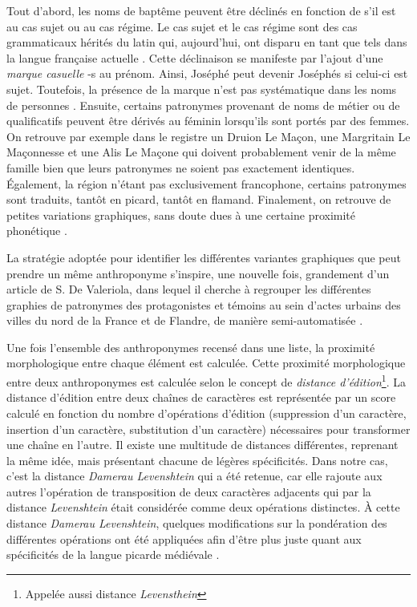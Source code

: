 Tout d'abord, les noms de baptême peuvent être déclinés en fonction de s'il est au cas sujet ou au cas régime\parencite{de_valeriola_lordinateur_2021}. Le cas sujet et le cas régime sont des cas grammaticaux hérités du latin qui, aujourd'hui, ont disparu en tant que tels dans la langue française actuelle \parencite{kalm_roland_2009}.
Cette déclinaison se manifeste par l'ajout d'une \textit{marque casuelle} \og -s \fg{} au prénom. Ainsi, \og Joséphé \fg{} peut devenir \og Joséphés \fg{} si celui-ci est sujet. Toutefois, la présence de la marque n'est pas systématique dans les noms de personnes \parencite{mazziotta_marquage_2014}.
Ensuite, certains patronymes provenant de noms de métier ou de qualificatifs peuvent être dérivés au féminin lorsqu'ils sont portés par des femmes. On retrouve par exemple dans le registre un Druion Le Maçon, une Margritain Le Maçonnesse et  une Alis Le Maçone qui doivent probablement venir de la même famille bien que leurs patronymes ne soient pas exactement identiques. Également, la région n'étant pas exclusivement francophone, certains patronymes sont traduits, tantôt en picard, tantôt en flamand. Finalement, on retrouve de petites variations graphiques, sans doute dues à une certaine proximité phonétique \parencite{de_valeriola_lordinateur_2021}.

La stratégie adoptée pour identifier les différentes variantes graphiques que peut prendre un même anthroponyme s'inspire, une nouvelle fois, grandement d'un article de S. De Valeriola, dans lequel il cherche à regrouper les différentes graphies de patronymes des protagonistes et témoins au sein d'actes urbains des villes du nord de la France et de Flandre, de manière semi-automatisée \parencite{de_valeriola_lordinateur_2021}.

Une fois l'ensemble des anthroponymes recensé dans une liste, la proximité morphologique entre chaque élément est calculée. Cette proximité morphologique entre deux anthroponymes est calculée selon le concept de \textit{distance d'édition}\footnote{Appelée aussi distance \textit{Levensthein}}. 
La distance d'édition entre deux chaînes de caractères est représentée par un score calculé en fonction du nombre d'opérations d'édition (suppression d'un caractère, insertion d'un caractère, substitution d'un caractère) nécessaires pour transformer une chaîne en l'autre. Il existe une multitude de distances différentes, reprenant la même idée, mais présentant chacune de légères spécificités. 
Dans notre cas, c'est la distance \textit{Damerau Levenshtein} qui a été retenue, car elle rajoute aux autres l'opération de transposition de deux caractères adjacents qui par la distance \textit{Levenshtein} était considérée comme deux opérations distinctes. 
À cette distance \textit{Damerau Levenshtein}, quelques modifications sur la pondération des différentes opérations ont été appliquées afin d'être plus juste quant aux spécificités de la langue picarde médiévale \parencite{de_valeriola_lordinateur_2021}.

